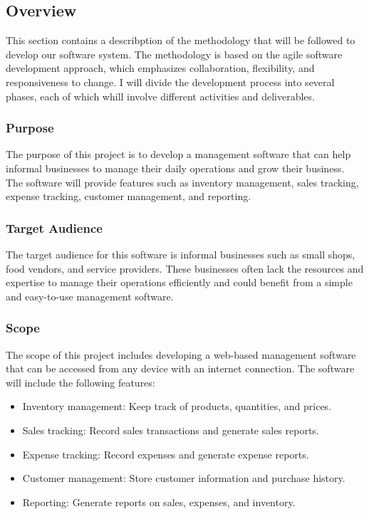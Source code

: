 \documentclass{article}
\begin{document}
\subsection{Overview}

This section contains a describption of the methodology that will be followed to develop our software system. The methodology is based on the agile software development approach, which emphasizes collaboration, flexibility, and responsiveness to change. I will divide the development process into several phases, each of which whill involve different activities and deliverables.

\subsubsection{Purpose}
The purpose of this project is to develop a management software that can help informal businesses to manage their daily operations and grow their business. The software will provide features such as inventory management, sales tracking, expense tracking, customer management, and reporting.

\subsubsection{Target Audience}
The target audience for this software is informal businesses such as small shops, food vendors, and service providers. These businesses often lack the resources and expertise to manage their operations efficiently and could benefit from a simple and easy-to-use management software.

\subsubsection{Scope}
The scope of this project includes developing a web-based management software that can be accessed from any device with an internet connection. The software will include the following features:

\begin{itemize}
    \item Inventory management: Keep track of products, quantities, and prices.
    \item Sales tracking: Record sales transactions and generate sales reports.
    \item Expense tracking: Record expenses and generate expense reports.
    \item Customer management: Store customer information and purchase history.
    \item Reporting: Generate reports on sales, expenses, and inventory.
\end{itemize}
\newpage
\end{document}
